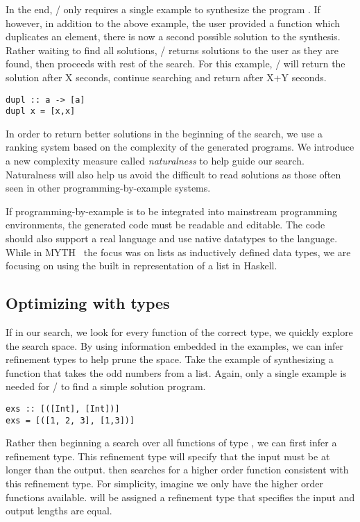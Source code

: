 In the end, \ourTool/ only requires a single example to synthesize the program .
If however, in addition to the above example, the user provided a function  which duplicates an element, there is now a second possible solution to the synthesis.
Rather waiting to find all solutions, \ourTool/ returns solutions to the user as they are found, then proceeds with rest of the search.
For this example, \ourTool/ will return the solution  after X seconds, continue searching and return  after X+Y seconds.

\begin{lstlisting}
dupl :: a -> [a]
dupl x = [x,x]
\end{lstlisting}

In order to return better solutions in the beginning of the search, we use a ranking system based on the complexity of the generated programs.
We introduce a new complexity measure called \textit{naturalness} to help guide our search.
Naturalness will also help us avoid the difficult to read solutions as those often seen in other programming-by-example systems.

If programming-by-example is to be integrated into mainstream programming environments, the generated code must be readable and editable.
The code should also support a real language and use native datatypes to the language.
While in MYTH~\cite{Osera:2015} the focus was on lists as inductively defined data types, we are focusing on using the built in representation of a list in Haskell.

\subsection{Optimizing with types}

If in our search, we look for every function of the correct type, we quickly explore the search space.
By using information embedded in the examples, we can infer refinement types to help prune the space.
Take the example of synthesizing a function that takes the odd numbers from a list.
Again, only a single example is needed for \ourTool/ to find a simple solution program.

\begin{lstlisting}
exs :: [([Int], [Int])]
exs = [([1, 2, 3], [1,3])]
\end{lstlisting}

Rather then beginning a search over all functions of type \codeinline{[Int] -> [Int]}, we can first infer a refinement type.
This refinement type will specify that the input must be at longer than the output.
\ourTool then searches for a higher order function consistent with this refinement type.
For simplicity, imagine we only have the higher order functions  available.
 will be assigned a refinement type that specifies the input and output lengths are equal.


